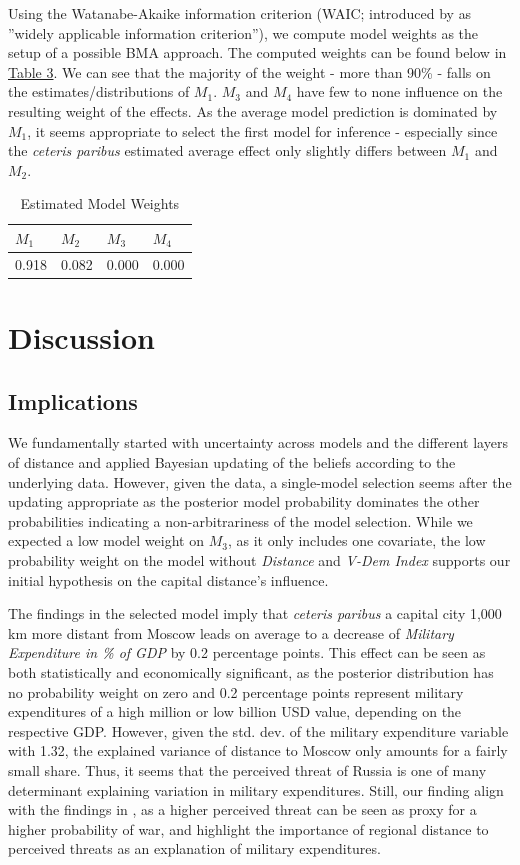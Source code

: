 \documentclass[12pt,a4paper]{article}
\begin{document}
Using the Watanabe-Akaike information criterion (WAIC; introduced by \citealp{watanabe2010} as ''widely applicable information criterion''), we compute model weights as the setup of a possible BMA approach. The computed weights can be found below in \hyperref[T:3]{\color{blue}Table 3}. We can see that the majority of the weight - more than 90\% - falls on the estimates/distributions of $M_1$. $M_3$ and $M_4$ have few to none influence on the resulting weight of the effects. As the average model prediction is dominated by $M_1$, it seems appropriate to select the first model for inference - especially since the \textit{ceteris paribus} estimated average effect only slightly differs between $M_1$ and $M_2$.
\begin{table}[h] \centering 
  \caption{Estimated Model Weights} 
  \label{T:3} 
\begin{tabular}{llll}
\hline \hline
$M_1$& $M_2$ & $M_3$& $M_4$\\ \hline
0.918 & 0.082 & 0.000 & 0.000 \\ \hline \hline
\end{tabular}
\end{table}
 

\section{Discussion}
\subsection{Implications}
We fundamentally started with uncertainty across models and the different layers of distance and applied Bayesian updating of the beliefs according to the underlying data. However, given the data, a single-model selection seems after the updating appropriate as the posterior model probability dominates the other probabilities indicating a non-arbitrariness of the model selection. While we expected a low model weight on $M_3$, as it only includes one covariate, the low probability weight on the model without \textit{Distance} and \textit{V-Dem Index} supports our initial hypothesis on the capital distance's influence.

The findings in the selected model imply that \textit{ceteris paribus} a capital city 1,000 km more distant from Moscow leads on average to a decrease of \textit{Military Expenditure in \% of GDP} by 0.2 percentage points. This effect can be seen as both statistically and economically significant, as the posterior distribution has no probability weight on zero and 0.2 percentage points represent military expenditures of a high million or low billion USD value, depending on the respective GDP. However, given the std. dev. of the military expenditure variable with 1.32, the explained variance of distance to Moscow only amounts for a fairly small share. Thus, it seems that the perceived threat of Russia is one of many determinant explaining variation in military expenditures. Still, our finding align with the findings in \citet{nordhaus2012}, as a higher perceived threat can be seen as proxy for a higher probability of war, and highlight the importance of regional distance to perceived threats as an explanation of military expenditures. 
\end{document}

